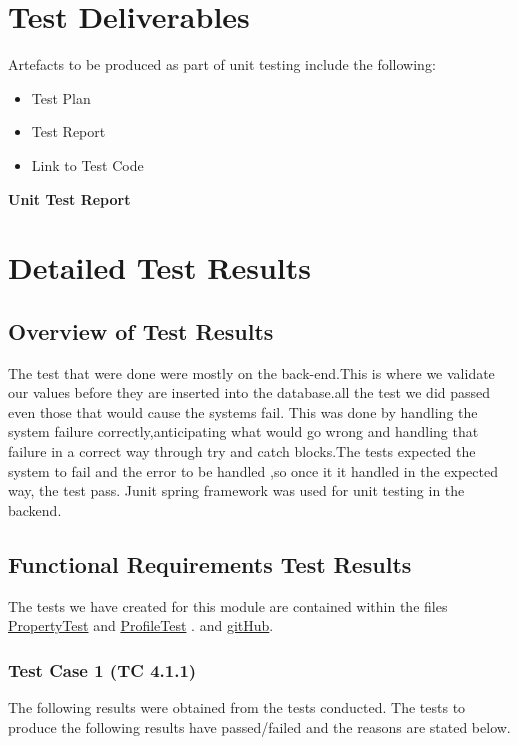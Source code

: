 \documentclass[a4paper,12pt]{article}
\begin{document}
\section{Test Deliverables}
Artefacts to be produced as part of unit testing include the following:
\begin{itemize}
\item Test Plan
\item Test Report
\item Link to Test Code
\end{itemize}

\newpage
\begin{center}
{\huge \bfseries Unit Test Report}\\[0.5cm]
\end{center}
\section{Detailed Test Results}
\subsection{Overview of Test Results}
The test that were done were mostly on the back-end.This is where we validate our values before they are inserted into the database.all the test we did passed even those that would cause the systems fail. This was done by handling the system failure correctly,anticipating what would go wrong and handling that failure in a correct way through try and catch blocks.The tests expected the system to fail and the error to be handled ,so once it it handled in the expected way, the test pass. Junit spring framework was used for unit testing in the backend. 

\subsection{Functional Requirements Test Results}
The tests we have created for this module are contained within the files   \href{https://github.com/u13278012/IMPAKD/blob/master/Implementation/PIO/BackEnd/test/Test/PropertyTest.java}{PropertyTest} and  \href{https://github.com/u13278012/IMPAKD/blob/master/Implementation/PIO/BackEnd/test/Test/ProfileTest.java}{ProfileTest} . and \href{https://github.com/u13278012/IMPAKD/}{gitHub}.

\subsubsection{Test Case 1 (TC 4.1.1)}
The following results were obtained from the tests conducted. The tests to produce the
following results have passed/failed and the reasons are stated below.
\end{document}
